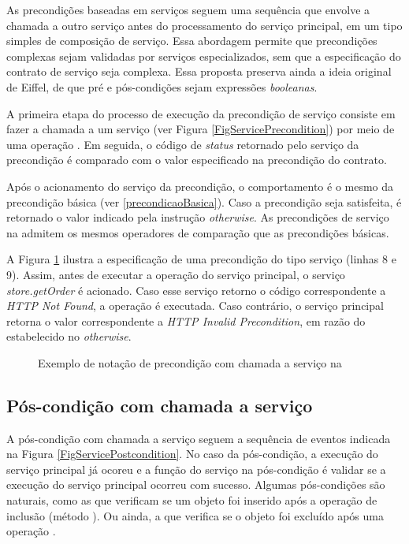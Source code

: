 As precondições baseadas em serviços seguem uma sequência que envolve a chamada
a outro serviço antes do processamento do serviço principal, em um tipo simples de
composição de serviço. Essa abordagem permite que precondições complexas sejam
validadas por serviços especializados, sem que a especificação do contrato
de serviço seja complexa. Essa proposta preserva ainda a ideia original de
Eiffel\cite{meyer1988eiffel}, de que pré e pós-condições sejam expressões
\emph{booleanas}.

A primeira etapa do processo de execução da precondição de serviço consiste em
fazer a chamada a um serviço (ver Figura \ref{FigServicePrecondition}) por meio de uma
operação . Em seguida, o código de \textit{status} retornado pelo
serviço da precondição é comparado com o valor especificado na precondição do contrato.

Após o acionamento do serviço da precondição, o comportamento é o mesmo da
precondição básica (ver \ref{precondicaoBasica}). Caso a precondição seja
satisfeita, é retornado o valor indicado pela instrução \emph{otherwise}. As
precondições de serviço na \neoidl{} admitem os mesmos operadores de comparação
que as precondições básicas.

A Figura \ref{lst:DBCPreCondServico} ilustra a especificação de uma precondição
do tipo serviço (linhas 8 e 9). Assim, antes de executar a operação 
do serviço principal, o serviço \emph{store.getOrder} é acionado. Caso esse
serviço retorno o código correspondente a \emph{HTTP Not Found}, a operação
 é executada. Caso contrário, o serviço principal retorna o valor
correspondente a \emph{HTTP Invalid Precondition}, em razão do estabelecido no
\emph{otherwise}.


\begin{figure}[htb]
\begin{small}

\end{small}
\caption{Exemplo de notação de precondição com chamada a serviço na
\neoidl{}} 
\label{lst:DBCPreCondServico}
\end{figure} 



\subsection{Pós-condição com chamada a serviço}
\label{Pos-condicao servico}

A pós-condição com chamada a serviço seguem a sequência de eventos indicada na
Figura \ref{FigServicePostcondition}. No caso da pós-condição, a execução do
serviço principal já ocoreu e a função do serviço na pós-condição é validar se a
execução do serviço principal ocorreu com sucesso. Algumas pós-condições são
naturais, como as que verificam se um objeto foi inserido após a operação de
inclusão (método ). Ou ainda, a que verifica se o objeto foi excluído
após uma operação .

